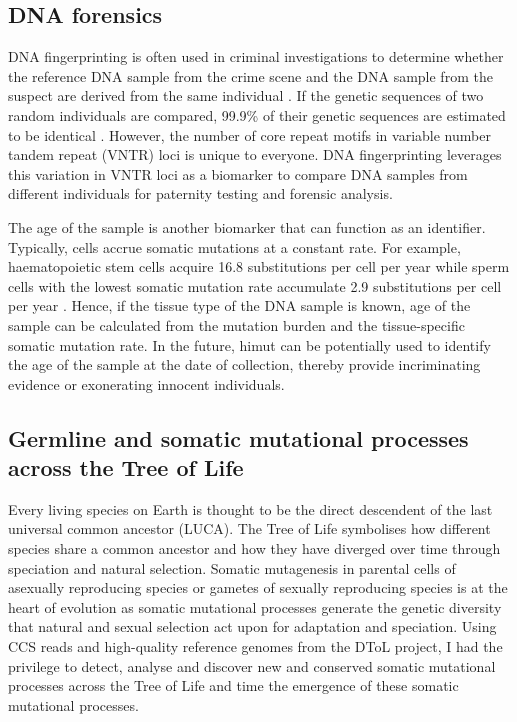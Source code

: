\subsection{DNA forensics}

DNA fingerprinting is often used in criminal investigations to determine whether the reference DNA sample from the crime scene and the DNA sample from the suspect are derived from the same individual \cite{Gill1985-dt}. If the genetic sequences of two random individuals are compared, 99.9\% of their genetic sequences are estimated to be identical \cite{1000_Genomes_Project_Consortium2012-rj}. However, the number of core repeat motifs in variable number tandem repeat (VNTR) loci is unique to everyone. DNA fingerprinting leverages this variation in VNTR loci as a biomarker to compare DNA samples from different individuals for paternity testing and forensic analysis.  

The age of the sample is another biomarker that can function as an identifier.  Typically, cells accrue somatic mutations at a constant rate. For example, haematopoietic stem cells acquire 16.8 substitutions per cell per year \cite{Mitchell2022-ry, Osorio2018-mh} while sperm cells with the lowest somatic mutation rate accumulate 2.9 substitutions per cell per year \cite{Rahbari2016-ot}. Hence, if the tissue type of the DNA sample is known, age of the sample can be calculated from the mutation burden and the tissue-specific somatic mutation rate. In the future, himut can be potentially used to identify the age of the sample at the date of collection, thereby provide incriminating evidence or exonerating innocent individuals. 

\subsection{Germline and somatic mutational processes across the Tree of Life}

Every living species on Earth is thought to be the direct descendent of the last universal common ancestor (LUCA). The Tree of Life symbolises how different species share a common ancestor and how they have diverged over time through speciation and natural selection. Somatic mutagenesis in parental cells of asexually reproducing species or gametes of sexually reproducing species is at the heart of evolution as somatic mutational processes generate the genetic diversity that natural and sexual selection act upon for adaptation and speciation. Using CCS reads and high-quality reference genomes from the DToL project, I had the privilege to detect, analyse and discover new and conserved somatic mutational processes across the Tree of Life and time the emergence of these somatic mutational processes. 

